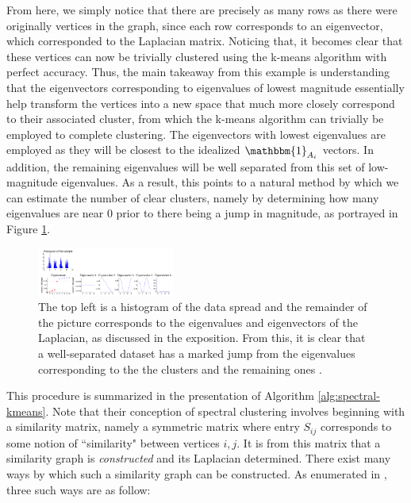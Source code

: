 \documentclass[journal]{IEEEtran}
\begin{document}
From here, we simply notice that there are precisely as many rows as there were originally vertices in the graph, since each row corresponds to an eigenvector, which corresponded to the Laplacian matrix. Noticing that, it becomes clear that these vertices can now be trivially clustered using the k-means algorithm with perfect accuracy. Thus, the main takeaway from this example is understanding that the eigenvectors corresponding to eigenvalues of lowest magnitude essentially help transform the vertices into a new space that much more closely correspond to their associated cluster, from which the k-means algorithm can trivially be employed to complete clustering. The eigenvectors with lowest eigenvalues are employed as they will be closest to the idealized $\mathbbm{1}_{A_i}$ vectors. In addition, the remaining eigenvalues will be well separated from this set of low-magnitude eigenvalues. As a result, this points to a natural method by which we can estimate the number of clear clusters, namely by determining how many eigenvalues are near 0 prior to there being a jump in magnitude, as portrayed in Figure \ref{fig:spectral_example}.

\begin{figure}
    \label{fig:spectral_example}
    \centering
    \includegraphics[width=0.4\textwidth]{spectral_example.png}
    \caption{The top left is a histogram of the data spread and the remainder of the picture corresponds to the eigenvalues and eigenvectors of the Laplacian, as discussed in the exposition. From this, it is clear that a well-separated dataset has a marked jump from the eigenvalues corresponding to the the clusters and the remaining ones \cite{spectral}.}
\end{figure}

This procedure is summarized in the presentation of Algorithm \ref{alg:spectral-kmeans}. Note that their conception of spectral clustering involves beginning with a similarity matrix, namely a symmetric matrix where entry $S_{ij}$ corresponds to some notion of ``similarity" between vertices $i,j$. It is from this matrix that a similarity graph is \textit{constructed} and its Laplacian determined. There exist many ways by which such a similarity graph can be constructed. As enumerated in \cite{spectral}, three such ways are as follow:
\end{document}

